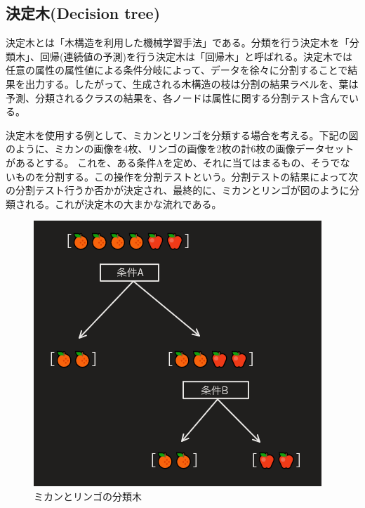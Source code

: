 \documentclass[dvipdfmx]{jsarticle}
\begin{document}
\subsection{決定木(Decision tree)}
決定木とは「木構造を利用した機械学習手法」である。分類を行う決定木を「分類木」、回帰(連続値の予測)を行う決定木は「回帰木」と呼ばれる。決定木では任意の属性の属性値による条件分岐によって、データを徐々に分割することで結果を出力する。したがって、生成される木構造の枝は分割の結果ラベルを、葉は予測、分類されるクラスの結果を、各ノードは属性に関する分割テスト含んでいる。\par
決定木を使用する例として、ミカンとリンゴを分類する場合を考える。下記の図のように、ミカンの画像を4枚、リンゴの画像を2枚の計6枚の画像データセットがあるとする。
これを、ある条件Aを定め、それに当てはまるもの、そうでないものを分割する。この操作を分割テストという。分割テストの結果によって次の分割テスト行うか否かが決定され、最終的に、ミカンとリンゴが図のように分類される。これが決定木の大まかな流れである。
\begin{figure}[H]
  \centering
  \includegraphics[scale=0.6]{decition_ex1.PNG}
  \caption{ミカンとリンゴの分類木}
\end{figure}
\end{document}
